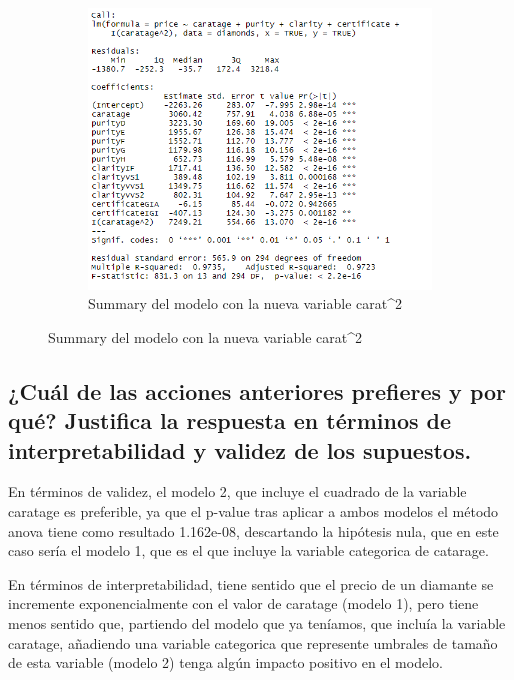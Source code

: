 \documentclass[a4paper, 9pt]{article}
\begin{document}
\begin{figure}[h!]
  \centering
  \begin{subfigure}[b]{0.8\linewidth}
    \includegraphics[width=\linewidth]{report/images/question-3/3b-summary.png}
    \caption{Summary del modelo con la nueva variable carat^2}
  \end{subfigure}
  \label{fig:coffee}
\end{figure}


\subsection{¿Cuál de las acciones anteriores prefieres y por qué? Justifica la respuesta en términos de interpretabilidad y validez de los supuestos.}
\label{subsec:question-4}

En términos de validez, el modelo 2, que incluye el cuadrado de la variable caratage es preferible, ya que el p-value tras aplicar a ambos modelos el método anova tiene como resultado 1.162e-08, descartando la hipótesis nula, que en este caso sería el modelo 1, que es el que incluye la variable categorica de catarage.

En términos de interpretabilidad, tiene sentido que el precio de un diamante se incremente exponencialmente con el valor de caratage (modelo 1), pero tiene menos sentido que, partiendo del modelo que ya teníamos, que incluía la variable caratage, añadiendo una variable categorica que represente umbrales de tamaño de esta variable (modelo 2) tenga algún impacto positivo en el modelo.
\end{document}
